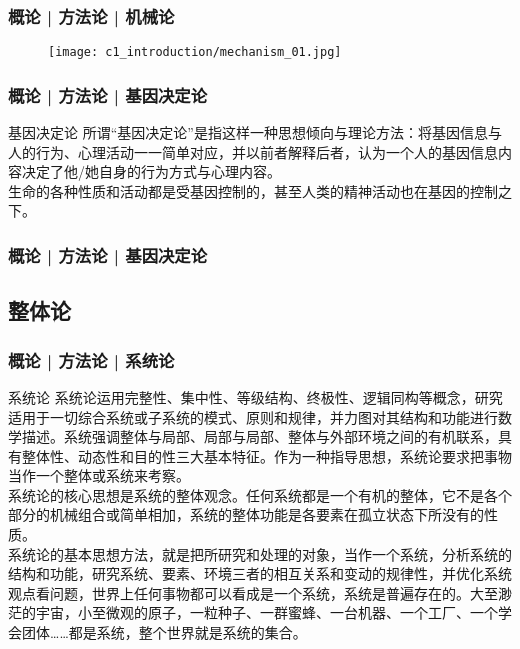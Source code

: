 \begin{frame}
  \frametitle{概论 | 方法论 | 机械论}
  \begin{figure}
    \centering
    \texttt{[image: c1\_introduction/mechanism\_01.jpg]}
  \end{figure}
\end{frame}

\begin{frame}
  \frametitle{概论 | 方法论 | 基因决定论}
  \begin{block}{基因决定论}
所谓“基因决定论”是指这样一种思想倾向与理论方法：将基因信息与人的行为、心理活动一一简单对应，并以前者解释后者，认为一个人的基因信息内容决定了他/她自身的行为方式与心理内容。\\
\vspace{1em}
  生命的各种性质和活动都是受基因控制的，甚至人类的精神活动也在基因的控制之下。
  \end{block}
\end{frame}

\begin{frame}
  \frametitle{概论 | 方法论 | 基因决定论}
  \begin{figure}
    \centering
    \qquad
  \end{figure}
\end{frame}

\subsection{整体论}
\begin{frame}
  \frametitle{概论 | 方法论 | 系统论}
  \begin{block}{系统论}
系统论运用完整性、集中性、等级结构、终极性、逻辑同构等概念，研究适用于一切综合系统或子系统的模式、原则和规律，并力图对其结构和功能进行数学描述。系统强调整体与局部、局部与局部、整体与外部环境之间的有机联系，具有整体性、动态性和目的性三大基本特征。作为一种指导思想，系统论要求把事物当作一个整体或系统来考察。\\
\vspace{0.5em}
系统论的核心思想是系统的整体观念。任何系统都是一个有机的整体，它不是各个部分的机械组合或简单相加，系统的整体功能是各要素在孤立状态下所没有的性质。\\
\vspace{0.5em}
系统论的基本思想方法，就是把所研究和处理的对象，当作一个系统，分析系统的结构和功能，研究系统、要素、环境三者的相互关系和变动的规律性，并优化系统观点看问题，世界上任何事物都可以看成是一个系统，系统是普遍存在的。大至渺茫的宇宙，小至微观的原子，一粒种子、一群蜜蜂、一台机器、一个工厂、一个学会团体……都是系统，整个世界就是系统的集合。
  \end{block}
\end{frame}

